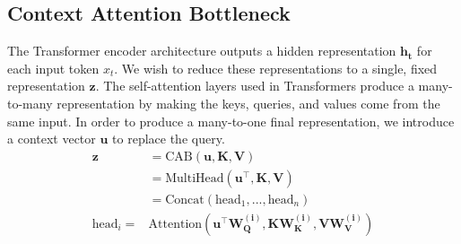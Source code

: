 \subsection{Context Attention Bottleneck}
The Transformer encoder architecture outputs a hidden representation $\mathbf{h_t}$ for each input token $x_t$. We wish to reduce these representations to a single, fixed representation $\mathbf{z}$. The self-attention layers used in Transformers produce a many-to-many representation by making the keys, queries, and values come from the same input. In order to produce a many-to-one final representation, we introduce a context vector $\mathbf{u}$ to replace the query. 
\begin{align*}
    \mathbf{z} &= \text{CAB}(\mathbf{u}, \mathbf{K}, \mathbf{V}) \\
    &= \text{MultiHead}(\mathbf{u}^\top, \mathbf{K}, \mathbf{V}) \\
       &= \text{Concat}(\text{head}_1, ..., \text{head}_n) \\%
      \text{head}_i = & \text{Attention}(\mathbf{u}^\top \mathbf{W^{(i)}_Q}, \mathbf{K} \mathbf{W^{(i)}_K}, \mathbf{V} \mathbf{W^{(i)}_V})
\end{align*} 





